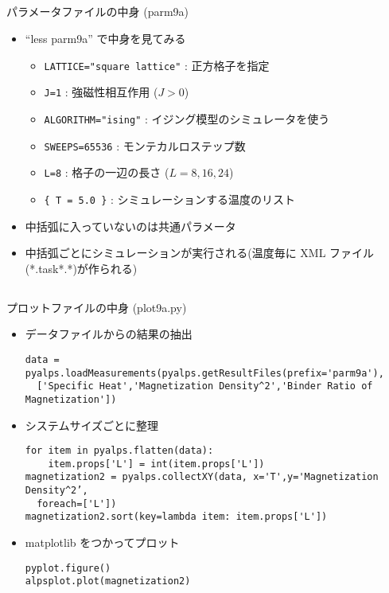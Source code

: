 \subsection*{\redb\whiteb\greenm}
\begin{frame}[t,fragile]{パラメータファイルの中身 (parm9a)}
  \begin{itemize}
    \setlength{\itemsep}{1em}
  \item ``less parm9a'' で中身を見てみる
    \begin{itemize}
    \item \verb+LATTICE="square lattice"+ : 正方格子を指定
    \item \verb+J=1+ : 強磁性相互作用 ($J>0$)
    \item \verb+ALGORITHM="ising"+ : イジング模型のシミュレータを使う
    \item \verb+SWEEPS=65536+ : モンテカルロステップ数
    \item \verb+L=8+ : 格子の一辺の長さ ($L=8, 16, 24$)
    \item \verb+{ T = 5.0 }+ : シミュレーションする温度のリスト
    \end{itemize}
  \item 中括弧に入っていないのは共通パラメータ
  \item 中括弧ごとにシミュレーションが実行される(温度毎に XML ファイル(*.task*.*)が作られる)
  \end{itemize}
\end{frame}

\subsection*{\redb\whiteb\greenm}
\begin{frame}{プロットファイルの中身 (plot9a.py)}
  \begin{itemize}
  \item データファイルからの結果の抽出
\begin{lstlisting}
data = pyalps.loadMeasurements(pyalps.getResultFiles(prefix='parm9a'),
  ['Specific Heat','Magnetization Density^2','Binder Ratio of Magnetization'])
\end{lstlisting}
  \item システムサイズごとに整理
\begin{lstlisting}
for item in pyalps.flatten(data):
    item.props['L'] = int(item.props['L'])
magnetization2 = pyalps.collectXY(data, x='T',y='Magnetization Density^2’,
  foreach=['L'])
magnetization2.sort(key=lambda item: item.props['L'])
\end{lstlisting}
  \item matplotlib をつかってプロット
\begin{lstlisting}
pyplot.figure()
alpsplot.plot(magnetization2)
\end{lstlisting}
  \end{itemize}
\end{frame}

